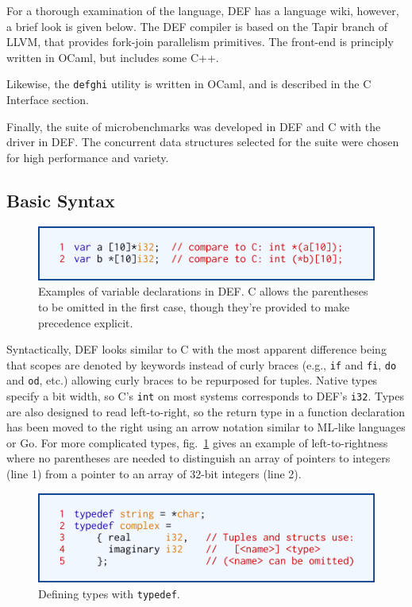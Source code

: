 For a thorough examination of the language, DEF has a language wiki,\cite{DEFWiki} however, a brief look is given below.  The DEF compiler is based on the Tapir branch of LLVM, that provides fork-join parallelism primitives.\cite{TAPIR,LLVM}  The front-end is principly written in OCaml, but includes some C++.

Likewise, the \texttt{defghi} utility is written in OCaml,\cite{DEF} and is described in the C Interface section.

Finally, the suite of microbenchmarks was developed in DEF and C with the driver in DEF.  The concurrent data structures selected for the suite were chosen for high performance and variety.

\subsection{Basic Syntax}

\begin{figure}[htbp!]
        \centering
        \includegraphics[scale=0.25]{gfx/types}
        \caption{Examples of variable declarations in DEF.  C allows the parentheses to be omitted in the first case, though they're provided to make precedence explicit.}
        \label{fig:types}
\end{figure}

Syntactically, DEF looks similar to C with the most apparent difference being that scopes are denoted by keywords instead of curly braces (e.g., \texttt{if} and \texttt{fi}, \texttt{do} and \texttt{od}, etc.) allowing curly braces to be repurposed for tuples.  Native types specify a bit width, so C's \texttt{int} on most systems corresponds to DEF's \texttt{i32}.  Types are also designed to read left-to-right, so the return type in a function declaration has been moved to the right using an arrow notation similar to ML-like languages or Go.  For more complicated types, fig.~\ref{fig:types} gives an example of left-to-rightness where no parentheses are needed to distinguish an array of pointers to integers (line 1) from a pointer to an array of 32-bit integers (line 2).

\begin{figure}[htbp!]
        \centering
        \includegraphics[scale=0.25]{gfx/typedef}
        \caption{Defining types with \texttt{typedef}.}
        \label{fig:typedef}
\end{figure}

